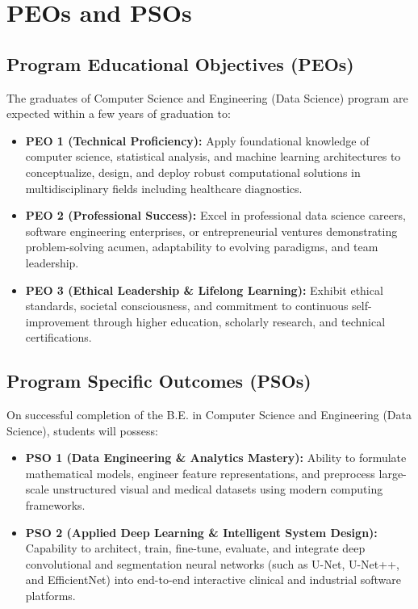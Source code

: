 \chapter*{PEOs and PSOs}

\section*{Program Educational Objectives (PEOs)}
The graduates of Computer Science and Engineering (Data Science) program are expected within a few years of graduation to:

\begin{itemize}
    \item \textbf{PEO 1 (Technical Proficiency):} Apply foundational knowledge of computer science, statistical analysis, and machine learning architectures to conceptualize, design, and deploy robust computational solutions in multidisciplinary fields including healthcare diagnostics.
    \item \textbf{PEO 2 (Professional Success):} Excel in professional data science careers, software engineering enterprises, or entrepreneurial ventures demonstrating problem-solving acumen, adaptability to evolving paradigms, and team leadership.
    \item \textbf{PEO 3 (Ethical Leadership \& Lifelong Learning):} Exhibit ethical standards, societal consciousness, and commitment to continuous self-improvement through higher education, scholarly research, and technical certifications.
\end{itemize}

\vspace{0.8cm}
\section*{Program Specific Outcomes (PSOs)}
On successful completion of the B.E. in Computer Science and Engineering (Data Science), students will possess:

\begin{itemize}
    \item \textbf{PSO 1 (Data Engineering \& Analytics Mastery):} Ability to formulate mathematical models, engineer feature representations, and preprocess large-scale unstructured visual and medical datasets using modern computing frameworks.
    \item \textbf{PSO 2 (Applied Deep Learning \& Intelligent System Design):} Capability to architect, train, fine-tune, evaluate, and integrate deep convolutional and segmentation neural networks (such as U-Net, U-Net++, and EfficientNet) into end-to-end interactive clinical and industrial software platforms.
\end{itemize}
